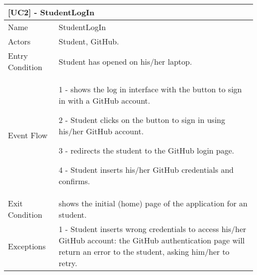 	\begin{longtable}{|p{3cm}p{14cm}|}
		\multicolumn{2}{l}{\textbf{[UC2] - StudentLogIn}}\\
		\hline
		Name & StudentLogIn \\
		\hline
		Actors & Student, GitHub. \\
		\hline
		Entry Condition & Student has opened \app on his/her laptop. \\
		\hline
		Event Flow &  
		
		1 - \app shows the log in interface with the button to sign in with a GitHub account.
		
		2 - Student clicks on the button to sign in using his/her GitHub account.
		
		3 - \app redirects the student to the GitHub login page.
		
		4 - Student inserts his/her GitHub credentials and confirms.
		\\
		\hline
		Exit Condition & \app shows the initial (home) page of the application for an student.  \\
		\hline
		Exceptions & 
		1 - Student inserts wrong credentials to access his/her GitHub account: the GitHub authentication page will return an error to the student, asking him/her to retry.\\
		\hline
    
    \end{longtable}
    
